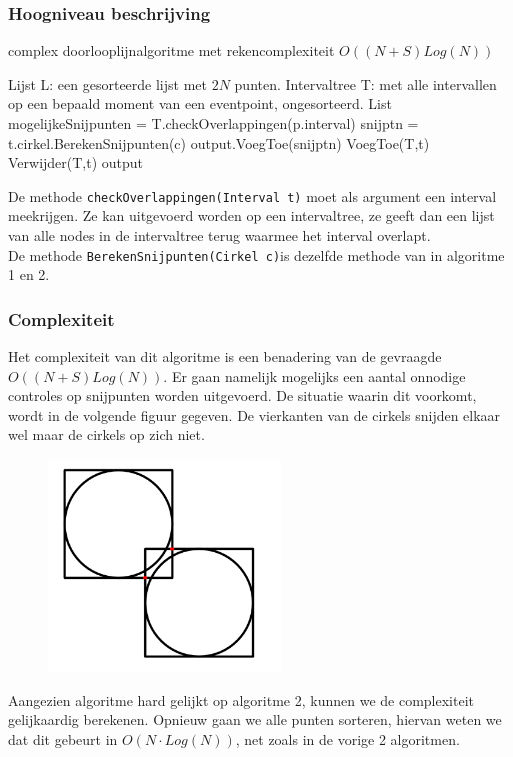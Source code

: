 \documentclass[11pt,a4paper]{article}
\begin{document}
\subsubsection{Hoogniveau beschrijving}
\begin{algorithm}[H]
\caption{complex doorlooplijnalgoritme met rekencomplexiteit $O((N+S)Log(N))$}
\begin{algorithmic}
\State Lijst L: een gesorteerde lijst met $2N$ punten.
\State Intervaltree T: met alle intervallen op een bepaald moment van een eventpoint, ongesorteerd.
\State List mogelijkeSnijpunten = T.checkOverlappingen(p.interval)
	\State snijptn = t.cirkel.BerekenSnijpunten(c)
	\State output.VoegToe(snijptn)
	\State VoegToe(T,t)
	\EndFor
\Else
\State Verwijder(T,t)
\EndIf
\EndFor
\Return output
\end{algorithmic}
\end{algorithm}
De methode \verb|checkOverlappingen(Interval t)| moet als argument een interval meekrijgen. Ze kan uitgevoerd worden op een intervaltree, ze geeft dan een lijst van alle nodes in de intervaltree terug waarmee het interval overlapt.\\
De methode \verb|BerekenSnijpunten(Cirkel c)|is dezelfde methode van in algoritme 1 en 2.
\subsubsection{Complexiteit}
Het complexiteit van dit algoritme is een benadering van de gevraagde $O((N+S)Log(N))$. Er gaan namelijk mogelijks een aantal onnodige controles op snijpunten worden uitgevoerd. De situatie waarin dit voorkomt, wordt in de volgende figuur gegeven. De vierkanten van de cirkels snijden elkaar wel maar de cirkels op zich niet.
\begin{figure}[H]
\centering
\includegraphics[width=0.55\textwidth]{onnodigecheck.png}
\end{figure}
Aangezien algoritme hard gelijkt op algoritme 2, kunnen we de complexiteit gelijkaardig berekenen. Opnieuw gaan we alle punten sorteren, hiervan weten we dat dit gebeurt in $O(N\cdot Log(N))$, net zoals in de vorige 2 algoritmen. 
\end{document}
